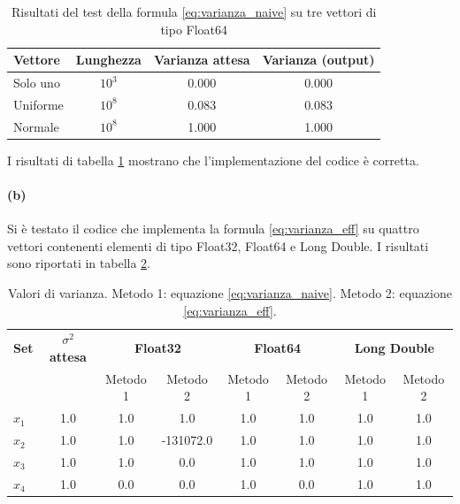 \documentclass[letterpaper, 12pt]{article}
\begin{document}
\begin{table}[h!]
\centering
\caption{Risultati del test della formula \ref{eq:varianza_naive} su tre vettori di tipo Float64}
\label{tab:varianza_test}
\begin{tabular}{|l|c|c|c|}
\hline
\textbf{Vettore} & \textbf{Lunghezza}   & \textbf{Varianza attesa} & \textbf{Varianza (output)} \\
\hline
Solo uno         & $10^3$               & 0.000                    & 0.000                       \\
Uniforme         & $10^8$               & 0.083                    & 0.083                       \\
Normale          & $10^8$               & 1.000                    & 1.000                       \\
\hline
\end{tabular}
\end{table}

I risultati di tabella \ref{tab:varianza_test} mostrano che l'implementazione del codice è corretta.

\paragraph{(b) }
Si è testato il codice che implementa la formula \ref{eq:varianza_eff} su quattro vettori contenenti
elementi di tipo Float32, Float64 e Long Double. I risultati sono riportati in tabella \ref{tab:varianza_precisioni}.

\begin{table}[h!]
\centering
\caption{Valori di varianza. Metodo 1: equazione \ref{eq:varianza_naive}. Metodo 2: equazione \ref{eq:varianza_eff}.}
\label{tab:varianza_precisioni}
\begin{tabular}{|l|c|cc|cc|cc|}
\hline
\textbf{Set} & \textbf{$\sigma^2$ attesa} 
& \multicolumn{2}{c|}{\textbf{Float32}} 
& \multicolumn{2}{c|}{\textbf{Float64}} 
& \multicolumn{2}{c|}{\textbf{Long Double}} \\
\cline{3-8}
      &     & Metodo 1 & Metodo 2  & Metodo 1 & Metodo 2 & Metodo 1 & Metodo 2 \\
\hline
$x_1$ & 1.0 & 1.0      & 1.0       & 1.0      & 1.0      & 1.0      & 1.0 \\
$x_2$ & 1.0 & 1.0      & -131072.0 & 1.0      & 1.0      & 1.0      & 1.0 \\
$x_3$ & 1.0 & 1.0      & 0.0       & 1.0      & 1.0      & 1.0      & 1.0 \\
$x_4$ & 1.0 & 0.0      & 0.0       & 1.0      & 0.0      & 1.0      & 1.0 \\
\hline
\end{tabular}
\end{table}
\end{document}
